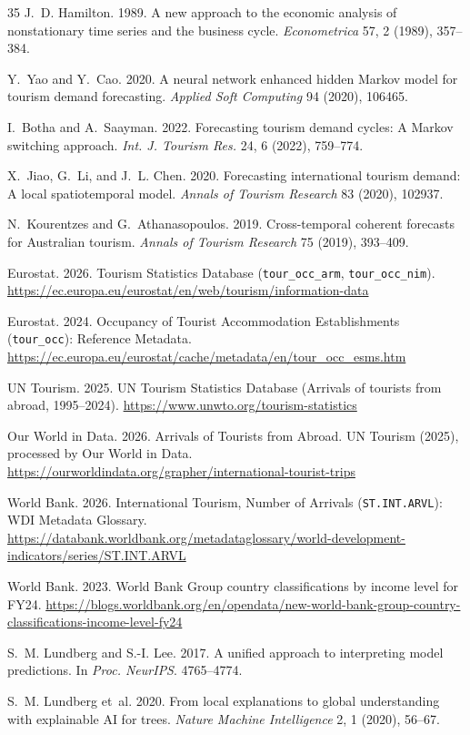 \documentclass[sigconf]{acmart}
\begin{document}
\begin{thebibliography}{35}
J.~D. Hamilton. 1989. A new approach to the economic analysis of nonstationary time series and the business cycle. \emph{Econometrica} 57, 2 (1989), 357--384.

Y.~Yao and Y.~Cao. 2020. A neural network enhanced hidden Markov model for tourism demand forecasting. \emph{Applied Soft Computing} 94 (2020), 106465.

I.~Botha and A.~Saayman. 2022. Forecasting tourism demand cycles: A Markov switching approach. \emph{Int. J. Tourism Res.} 24, 6 (2022), 759--774.

X.~Jiao, G.~Li, and J.~L. Chen. 2020. Forecasting international tourism demand: A local spatiotemporal model. \emph{Annals of Tourism Research} 83 (2020), 102937.

N.~Kourentzes and G.~Athanasopoulos. 2019. Cross-temporal coherent forecasts for Australian tourism. \emph{Annals of Tourism Research} 75 (2019), 393--409.

Eurostat. 2026. Tourism Statistics Database (\texttt{tour\_occ\_arm}, \texttt{tour\_occ\_nim}). \url{https://ec.europa.eu/eurostat/en/web/tourism/information-data}

Eurostat. 2024. Occupancy of Tourist Accommodation Establishments (\texttt{tour\_occ}): Reference Metadata. \url{https://ec.europa.eu/eurostat/cache/metadata/en/tour_occ_esms.htm}

UN Tourism. 2025. UN Tourism Statistics Database (Arrivals of tourists from abroad, 1995--2024). \url{https://www.unwto.org/tourism-statistics}

Our World in Data. 2026. Arrivals of Tourists from Abroad. UN Tourism (2025), processed by Our World in Data. \url{https://ourworldindata.org/grapher/international-tourist-trips}

World Bank. 2026. International Tourism, Number of Arrivals (\texttt{ST.INT.ARVL}): WDI Metadata Glossary. \url{https://databank.worldbank.org/metadataglossary/world-development-indicators/series/ST.INT.ARVL}

World Bank. 2023. World Bank Group country classifications by income level for FY24. \url{https://blogs.worldbank.org/en/opendata/new-world-bank-group-country-classifications-income-level-fy24}

S.~M. Lundberg and S.-I. Lee. 2017. A unified approach to interpreting model predictions. In \emph{Proc. NeurIPS}. 4765--4774.

S.~M. Lundberg et~al. 2020. From local explanations to global understanding with explainable AI for trees. \emph{Nature Machine Intelligence} 2, 1 (2020), 56--67.

\end{thebibliography}
\endgroup
\end{document}

